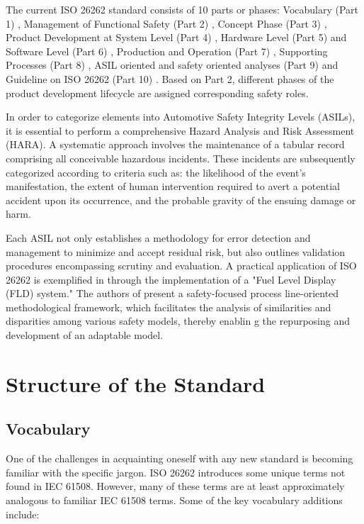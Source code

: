 \documentclass[./dissertation.tex]{subfiles}
\begin{document}
The current ISO 26262 standard consists of 10 parts or phases: Vocabulary (Part 1) \cite{iso26262-1}, Management of Functional Safety (Part 2) \cite{iso26262-2}, Concept Phase (Part 3) \cite{iso26262-3}, Product Development at System Level (Part 4) \cite{iso26262-4}, Hardware Level (Part 5) \cite{iso26262-5} and Software Level (Part 6) \cite{iso26262-6}, Production and Operation (Part 7) \cite{iso26262-7}, Supporting Processes (Part 8) \cite{iso26262-8}, ASIL oriented and safety oriented analyses (Part 9) \cite{iso26262-9} and Guideline on ISO 26262 (Part 10) \cite{iso26262-10}. Based on Part 2, different phases of the product development lifecycle are assigned corresponding safety roles.

In order to categorize elements into Automotive Safety Integrity Levels (ASILs), it is essential to perform a comprehensive Hazard Analysis and Risk Assessment (HARA). A systematic approach involves the maintenance of a tabular record comprising all conceivable hazardous incidents. These incidents are subsequently categorized according to criteria such as: the likelihood of the event's manifestation, the extent of human intervention required to avert a potential accident upon its occurrence, and the probable gravity of the ensuing damage or harm.

Each ASIL not only establishes a methodology for error detection and management to minimize and accept residual risk, but also outlines validation procedures encompassing scrutiny and evaluation. A practical application of ISO 26262 is exemplified in \cite{westman2013reference} through the implementation of a "Fuel Level Display (FLD) system." The authors of \cite{6903180} present a safety-focused process line-oriented methodological framework, which facilitates the analysis of similarities and disparities among various safety models, thereby enablin  g the repurposing and development of an adaptable model.

\section{Structure of the Standard}
\subsection{Vocabulary}

One of the challenges in acquainting oneself with any new standard is becoming familiar with the specific jargon. ISO 26262 introduces some unique terms not found in IEC 61508. However, many of these terms are at least approximately analogous to familiar IEC 61508 terms. Some of the key vocabulary additions include:
\end{document}
